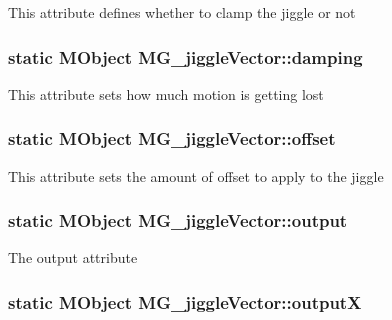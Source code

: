 This attribute defines whether to clamp the jiggle or not \hypertarget{class_m_g__jiggle_vector_ab8ca0ac264688ec4588a06dc2de254d0}{
\subsubsection[{damping}]{\setlength{\rightskip}{0pt plus 5cm}static M\-Object M\-G\-\_\-jiggle\-Vector\-::damping\hspace{0.3cm}{\ttfamily [static]}}}\label{class_m_g__jiggle_vector_ab8ca0ac264688ec4588a06dc2de254d0}
This attribute sets how much motion is getting lost \hypertarget{class_m_g__jiggle_vector_aace586c7205919a5f2cfd3004e398fe1}{
\subsubsection[{offset}]{\setlength{\rightskip}{0pt plus 5cm}static M\-Object M\-G\-\_\-jiggle\-Vector\-::offset\hspace{0.3cm}{\ttfamily [static]}}}\label{class_m_g__jiggle_vector_aace586c7205919a5f2cfd3004e398fe1}
This attribute sets the amount of offset to apply to the jiggle \hypertarget{class_m_g__jiggle_vector_ada4c47f0dc60de027fe146bc1bf991f1}{
\subsubsection[{output}]{\setlength{\rightskip}{0pt plus 5cm}static M\-Object M\-G\-\_\-jiggle\-Vector\-::output\hspace{0.3cm}{\ttfamily [static]}}}\label{class_m_g__jiggle_vector_ada4c47f0dc60de027fe146bc1bf991f1}
The output attribute \hypertarget{class_m_g__jiggle_vector_a8165d97e3ab365d18a77af35ec9bd9d6}{
\subsubsection[{output\-X}]{\setlength{\rightskip}{0pt plus 5cm}static M\-Object M\-G\-\_\-jiggle\-Vector\-::output\-X\hspace{0.3cm}{\ttfamily [static]}}}\label{class_m_g__jiggle_vector_a8165d97e3ab365d18a77af35ec9bd9d6}
